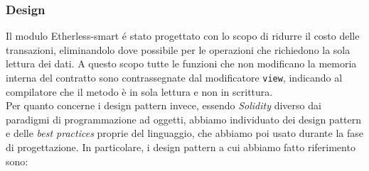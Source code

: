 \subsubsection{Design}
  Il modulo Etherless-smart é stato progettato con lo scopo di ridurre il costo delle transazioni, eliminandolo dove possibile per le operazioni che richiedono la sola lettura dei dati. A questo scopo tutte le funzioni che non modificano la memoria interna del contratto sono contrassegnate dal modificatore \texttt{view}, indicando al compilatore che il metodo è in sola lettura e non in scrittura. \\
  Per quanto concerne i design pattern invece, essendo \textit{Solidity} diverso dai paradigmi di programmazione ad oggetti, abbiamo individuato dei design pattern e delle \textit{best practices} proprie del linguaggio, che abbiamo poi usato durante la fase di progettazione. In particolare, i design pattern a cui abbiamo fatto riferimento sono:
